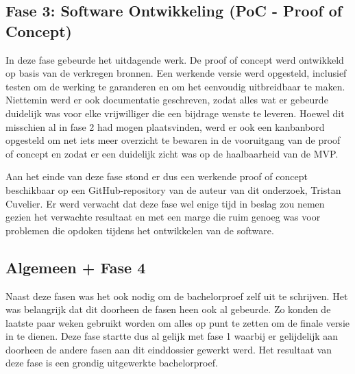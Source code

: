 \subsection{Fase 3: Software Ontwikkeling (PoC - Proof of Concept)}
In deze fase gebeurde het uitdagende werk. De proof of concept werd ontwikkeld op basis van de verkregen bronnen. Een werkende versie werd opgesteld, inclusief testen om de werking te garanderen en om het eenvoudig uitbreidbaar te maken. Niettemin werd er ook documentatie geschreven, zodat alles wat er gebeurde duidelijk was voor elke vrijwilliger die een bijdrage wenste te leveren. Hoewel dit misschien al in fase 2 had mogen plaatsvinden, werd er ook een kanbanbord opgesteld om net iets meer overzicht te bewaren in de vooruitgang van de proof of concept en zodat er een duidelijk zicht was op de haalbaarheid van de MVP.

Aan het einde van deze fase stond er dus een werkende proof of concept beschikbaar op een GitHub-repository van de auteur van dit onderzoek, Tristan Cuvelier. 
Er werd verwacht dat deze fase wel enige tijd in beslag zou nemen gezien het verwachte resultaat en met een marge die ruim genoeg was voor problemen die opdoken tijdens het ontwikkelen van de software.

\subsection{Algemeen + Fase 4}
Naast deze fasen was het ook nodig om de bachelorproef zelf uit te schrijven. Het was belangrijk dat dit doorheen de fasen heen ook al gebeurde. Zo konden de laatste paar weken gebruikt worden om alles op punt te zetten om de finale versie in te dienen. Deze fase startte dus al gelijk met fase 1 waarbij er gelijdelijk aan doorheen de andere fasen aan dit einddossier gewerkt werd.
Het resultaat van deze fase is een grondig uitgewerkte bachelorproef.